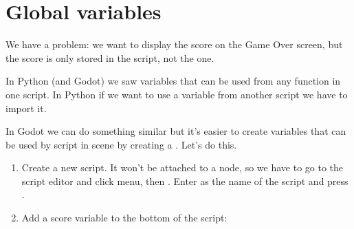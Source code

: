 \documentclass[a4paper,12pt,english]{sphinxmanual}
\begin{document}
\section{Global variables}
\label{\detokenize{tutorial:global-variables}}
\sphinxAtStartPar
We have a problem: we want to display the score on the Game Over screen,
but the score is only stored in the  script, not the
 one.

\sphinxAtStartPar
In Python (and Godot) we saw  variables that can be used from
any function in one script. In Python if we want to use a variable from
another script we have to import it.

\sphinxAtStartPar
In Godot we can do something similar but it’s easier to create variables
that can be used by  script in  scene by creating a . Let’s do this.
\begin{enumerate}
%
\item {} 
\sphinxAtStartPar
Create a new script. It won’t be attached to a node, so we have to go
to the script editor and click  menu, then .
Enter  as the name of the script and press .

\item {} 
\sphinxAtStartPar
Add a score variable to the bottom of the script:

\end{enumerate}
\end{document}
